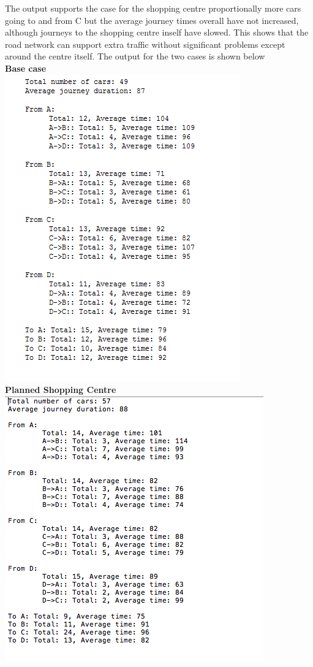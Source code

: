     The output supports the case for the shopping centre  proportionally more cars going to and from C but the average journey times overall have not increased, although journeys to the shopping centre inself have slowed. This shows that the road network can support extra traffic without significant problems except around the centre itself.  The output for the two cases is shown below\\ \textbf{Base case}\\
    \includegraphics[scale=0.8]{./images/scenario1.png}\\ \textbf{Planned Shopping Centre}\\
    \includegraphics[scale=0.8]{./images/scenario2_1.png}
    

